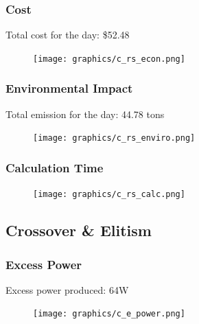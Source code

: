 \documentclass{article}
\begin{document}
        \subsubsection{Cost}
            Total cost for the day: \$52.48
            \begin{figure}[h!]
                \begin{center}
                    \texttt{[image: graphics/c\_rs\_econ.png]}
                \end{center}                
                \label{fig:CRScost}
            \end{figure}
        \newpage   
        \subsubsection{Environmental Impact}
            Total emission for the day: 44.78 tons
            \begin{figure}[h!]
                \begin{center}
                    \texttt{[image: graphics/c\_rs\_enviro.png]}
                \end{center}                
                \label{fig:CRSemissions}
            \end{figure}
        \subsubsection{Calculation Time}
            \begin{figure}[h!]
                \begin{center}
                    \texttt{[image: graphics/c\_rs\_calc.png]}
                \end{center}                
                \label{fig:CRScalc}
            \end{figure}
    \newpage        
    \subsection{Crossover \& Elitism}
        \subsubsection{Excess Power}
            Excess power produced: 64W
            \begin{figure}[h!]
                \begin{center}
                    \texttt{[image: graphics/c\_e\_power.png]}
                \end{center}
                \label{fig:CEpower}
            \end{figure}        
\end{document}
